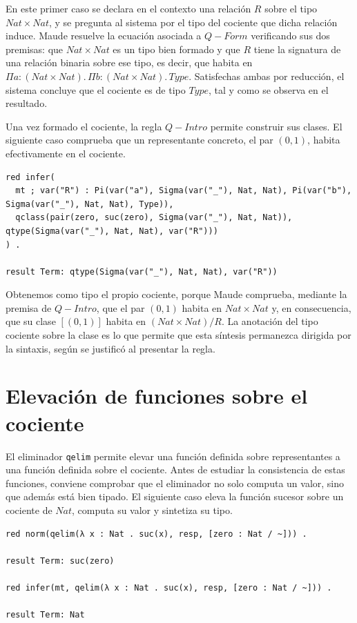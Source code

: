 En este primer caso se declara en el contexto una relación $R$ sobre el tipo $Nat \times Nat$, y se pregunta al sistema por el tipo del cociente que dicha relación induce. Maude resuelve la ecuación asociada a $Q-Form$ verificando sus dos premisas: que $Nat \times Nat$ es un tipo bien formado y que $R$ tiene la signatura de una relación binaria sobre ese tipo, es decir, que habita en $\Pi a : (Nat \times Nat) .\, \Pi b : (Nat \times Nat) .\, Type$. Satisfechas ambas por reducción, el sistema concluye que el cociente es de tipo $Type$, tal y como se observa en el resultado.

Una vez formado el cociente, la regla $Q-Intro$ permite construir sus clases. El siguiente caso comprueba que un representante concreto, el par $(0, 1)$, habita efectivamente en el cociente.

\begin{lstlisting}
red infer(
  mt ; var("R") : Pi(var("a"), Sigma(var("_"), Nat, Nat), Pi(var("b"), Sigma(var("_"), Nat, Nat), Type)),
  qclass(pair(zero, suc(zero), Sigma(var("_"), Nat, Nat)), qtype(Sigma(var("_"), Nat, Nat), var("R")))
) .

result Term: qtype(Sigma(var("_"), Nat, Nat), var("R"))
\end{lstlisting}

Obtenemos como tipo el propio cociente, porque Maude comprueba, mediante la premisa de $Q-Intro$, que el par $(0, 1)$ habita en $Nat \times Nat$ y, en consecuencia, que su clase $[(0, 1)]$ habita en $(Nat \times Nat) / R$. La anotación del tipo cociente sobre la clase es lo que permite que esta síntesis permanezca dirigida por la sintaxis, según se justificó al presentar la regla.

\section{Elevación de funciones sobre el cociente}

El eliminador \texttt{qelim} permite elevar una función definida sobre representantes a una función definida sobre el cociente. Antes de estudiar la consistencia de estas funciones, conviene comprobar que el eliminador no solo computa un valor, sino que además está bien tipado. El siguiente caso eleva la función sucesor sobre un cociente de $Nat$, computa su valor y sintetiza su tipo.

\begin{lstlisting}
red norm(qelim(λ x : Nat . suc(x), resp, [zero : Nat / ~])) .

result Term: suc(zero)

red infer(mt, qelim(λ x : Nat . suc(x), resp, [zero : Nat / ~])) .

result Term: Nat
\end{lstlisting}

